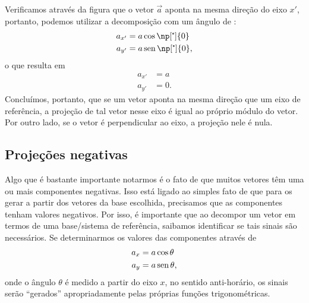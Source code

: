Verificamos através da figura que o vetor $\vec{a}$ aponta na mesma direção do eixo $x'$, portanto, podemos utilizar a decomposição com um ângulo de :
\begin{align}
    a_{x'} &= a \cos\np[\tcdegree]{0} \\
    a_{y'} &= a \sen\np[\tcdegree]{0},
\end{align}
%
o que resulta em
\begin{align}
    a_{x'} &= a \\
    a_{y'} &= 0.
\end{align}
%
Concluímos, portanto, que se um vetor aponta na mesma direção que um eixo de referência, a projeção de tal vetor nesse eixo é igual ao próprio módulo do vetor. Por outro lado, se o vetor é perpendicular ao eixo, a projeção nele é nula.

\subsection{Projeções negativas}

Algo que é bastante importante notarmos é o fato de que muitos vetores têm uma ou mais componentes negativas. Isso está ligado ao simples fato de que para os gerar a partir dos vetores da base escolhida, precisamos que as componentes tenham valores negativos. Por isso, é importante que ao decompor um vetor em termos de uma base/sistema de referência, saibamos identificar se tais sinais são necessários. Se determinarmos os valores das componentes através de
\begin{align}
    a_x &= a \cos\theta \\
    a_y &= a\operatorname{sen}\theta,
\end{align}
%
onde o ângulo $\theta$ é medido a partir do eixo $x$, no sentido anti-horário, os sinais serão ``gerados'' apropriadamente pelas próprias funções trigonométricas.


